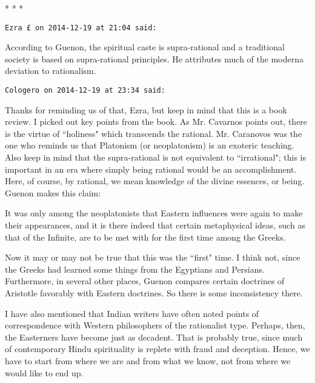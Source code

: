 
\begin{center}* * *\end{center}

\begin{footnotesize}\begin{sffamily}



\texttt{Ezra £ on 2014-12-19 at 21:04 said: }

According to Guenon, the spiritual caste is supra-rational and a traditional society is based on supra-rational principles. He attributes much of the moderna deviation to rationalism.


\hfill

\texttt{Cologero on 2014-12-19 at 23:34 said: }

Thanks for reminding us of that, Ezra, but keep in mind that this is a book review. I picked out key points from the book. As Mr. Cavarnos points out, there is the virtue of ``holiness" which transcends the rational. Mr. Caranovos was the one who reminds us that Platonism (or neoplatonism) is an exoteric teaching. Also keep in mind that the supra-rational is not equivalent to ``irrational"; this is important in an era where simply being rational would be an accomplishment. Here, of course, by rational, we mean knowledge of the divine essences, or being. Guenon makes this claim:

\begin{quotex}
It was only among the neoplatonists that Eastern influences were again to make their appearances, and it is there indeed that certain metaphysical ideas, such as that of the Infinite, are to be met with for the first time among the Greeks. 

\end{quotex}
Now it may or may not be true that this was the ``first" time. I think not, since the Greeks had learned some things from the Egyptians and Persians. Furthermore, in several other places, Guenon compares certain doctrines of Aristotle favorably with Eastern doctrines. So there is some inconsistency there.

I have also mentioned that Indian writers have often noted points of correspondence with Western philosophers of the rationalist type. Perhaps, then, the Easterners have become just as decadent. That is probably true, since much of contemporary Hindu spirituality is replete with fraud and deception. Hence, we have to start from where we are and from what we know, not from where we would like to end up.


\end{sffamily}\end{footnotesize}
